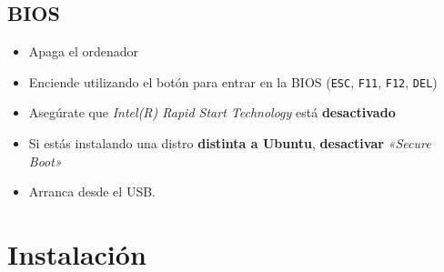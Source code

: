 \documentclass[aspectratio=43]{beamer}
\begin{document}
    \subsection{BIOS}
    \begin{frame}[fragile]{\secname}{\subsecname}
        \begin{itemize}
            \item Apaga el ordenador
            \item Enciende utilizando el botón para entrar en la BIOS
            (\verb!ESC!, \verb!F11!, \verb!F12!, \verb!DEL!)
            \item Asegúrate que \textit{Intel(R) Rapid Start Technology} está
            \textbf{desactivado}
            \item Si estás instalando una distro \textbf{distinta a Ubuntu},
            \textbf{desactivar} \textit{«Secure Boot»}
            \item Arranca desde el USB.
        \end{itemize}
    \end{frame}


    \section{Instalación}
\end{document}
